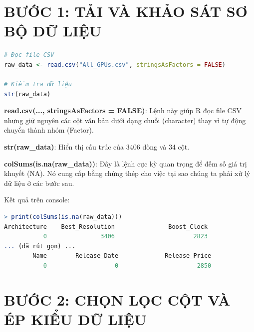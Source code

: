 \documentclass[12pt,a4paper]{article}
\begin{document}
\section*{BƯỚC 1: TẢI VÀ KHẢO SÁT SƠ BỘ DỮ LIỆU}

\begin{lstlisting}[language=R]
# Đọc file CSV
raw_data <- read.csv("All_GPUs.csv", stringsAsFactors = FALSE)

# Kiểm tra dữ liệu
str(raw_data)
\end{lstlisting}

\textbf{read.csv(..., stringsAsFactors = FALSE)}: Lệnh này giúp R đọc file CSV nhưng giữ nguyên các cột văn bản dưới dạng chuỗi (character) thay vì tự động chuyển thành nhóm (Factor).

\textbf{str(raw_data)}: Hiển thị cấu trúc của 3406 dòng và 34 cột.

\textbf{colSums(is.na(raw_data))}: Đây là lệnh cực kỳ quan trọng để đếm số giá trị khuyết (NA). Nó cung cấp bằng chứng thép cho việc tại sao chúng ta phải xử lý dữ liệu ở các bước sau.

Kết quả trên console:
\begin{lstlisting}[language=R]
> print(colSums(is.na(raw_data)))
Architecture    Best_Resolution               Boost_Clock 
           0               3406                      2823 
... (đã rút gọn) ...
        Name        Release_Date             Release_Price 
           0                   0                      2850 
\end{lstlisting}

\section*{BƯỚC 2: CHỌN LỌC CỘT VÀ ÉP KIỂU DỮ LIỆU}
\end{document}
